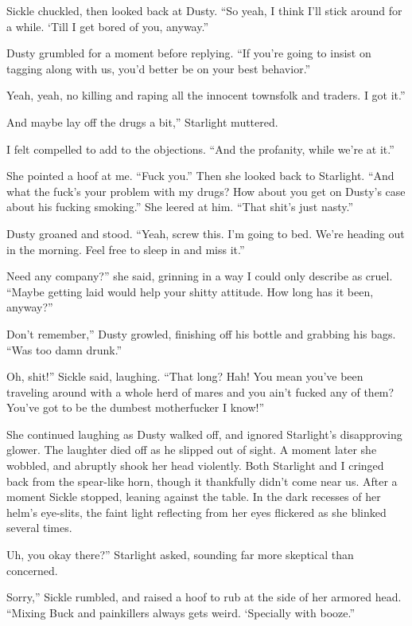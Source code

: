 Sickle chuckled, then looked back at Dusty. “So yeah, I think I’ll stick around for a while. ‘Till I get bored of you, anyway.”

Dusty grumbled for a moment before replying. “If you’re going to insist on tagging along with us, you’d better be on your best behavior.”

\leavevmode{}Yeah, yeah, no killing and raping all the innocent townsfolk and traders. I got it.”

\leavevmode{}And maybe lay off the drugs a bit,” Starlight muttered.

I felt compelled to add to the objections. “And the profanity, while we’re at it.”

She pointed a hoof at me. “Fuck you.” Then she looked back to Starlight. “And what the fuck’s your problem with my drugs? How about you get on Dusty’s case about his fucking smoking.” She leered at him. “That shit’s just nasty.”

Dusty groaned and stood. “Yeah, screw this. I’m going to bed. We’re heading out in the morning. Feel free to sleep in and miss it.”

\leavevmode{}Need any company?” she said, grinning in a way I could only describe as cruel. “Maybe getting laid would help your shitty attitude. How long has it been, anyway?”

\leavevmode{}Don’t remember,” Dusty growled, finishing off his bottle and grabbing his bags. “Was too damn drunk.”

\leavevmode{}Oh, shit!” Sickle said, laughing. “That long? Hah! You mean you’ve been traveling around with a whole herd of mares and you ain’t fucked any of them? You’ve got to be the dumbest motherfucker I know!”

She continued laughing as Dusty walked off, and ignored Starlight’s disapproving glower. The laughter died off as he slipped out of sight. A moment later she wobbled, and abruptly shook her head violently. Both Starlight and I cringed back from the spear-like horn, though it thankfully didn’t come near us. After a moment Sickle stopped, leaning against the table. In the dark recesses of her helm’s eye-slits, the faint light reflecting from her eyes flickered as she blinked several times.

\leavevmode{}Uh, you okay there?” Starlight asked, sounding far more skeptical than concerned.

\leavevmode{}Sorry,” Sickle rumbled, and raised a hoof to rub at the side of her armored head. “Mixing Buck and painkillers always gets weird. ‘Specially with booze.”

